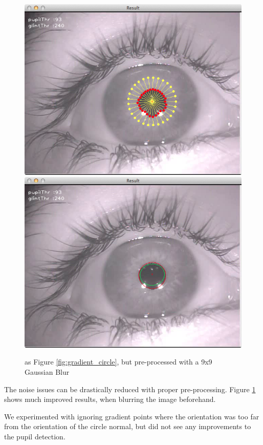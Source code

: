 \documentclass[a4paper,11pt]{article}
\begin{document}
\begin{figure}[ht]
  \centering
  \includegraphics[scale=0.25]{gradient_circle_gaussian_blur}
  \includegraphics[scale=0.25]{gradient_pupil_gaussian_blur}
  \caption{as Figure \ref{fig:gradient_circle}, but pre-processed with a 9x9 Gaussian Blur}
  \label{fig:gradient_circle_gaussian_blur}
\end{figure}

The noise issues can be drastically reduced with proper pre-processing. Figure \ref{fig:gradient_circle_gaussian_blur} shows much improved results, when blurring the image beforehand.

We experimented with ignoring gradient points where the orientation was too far from the orientation of the circle normal, but did not see any improvements to the pupil detection.
\end{document}
